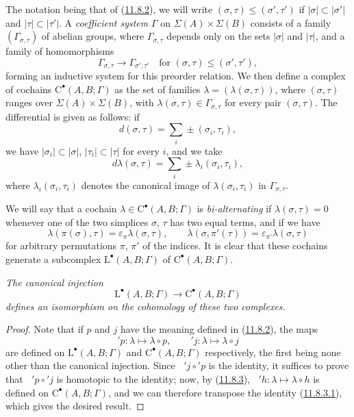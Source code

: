 \begin{env}[11.8.4]
\label{0.11.8.4}
The notation being that of (\hyperref[0.11.8.2]{11.8.2}), we will write
$(\sigma,\tau)\leq(\sigma',\tau')$ if $|\sigma|\subset|\sigma'|$ and
$|\tau|\subset|\tau'|$. A \emph{coefficient system} $\Gamma$ on
$\Sigma(A)\times\Sigma(B)$ consists of a family
$(\Gamma_{\sigma,\tau})$ of abelian groups, where
$\Gamma_{\sigma,\tau}$ depends only on the sets $|\sigma|$ and $|\tau|$,
and a family of homomorphisms
\[
\Gamma_{\sigma,\tau}\longrightarrow\Gamma_{\sigma',\tau'}
\quad\text{for }(\sigma,\tau)\leq(\sigma',\tau'),
\]
forming an inductive system for this preorder relation. We then define
a complex of cochains $\mathrm C^\bullet(A,B;\Gamma)$ as the set
of families $\lambda=(\lambda(\sigma,\tau))$, where $(\sigma,\tau)$ ranges over
$\Sigma(A)\times\Sigma(B)$, with
$\lambda(\sigma,\tau)\in\Gamma_{\sigma,\tau}$ for every pair
$(\sigma,\tau)$. The differential is given as follows: if
\[
d(\sigma,\tau)=\sum_i\pm(\sigma_i,\tau_i),
\]
we have $|\sigma_i|\subset|\sigma|$, $|\tau_i|\subset|\tau|$ for every $i$,
and we take
\[
d\lambda(\sigma,\tau)=\sum_i\pm\lambda_i(\sigma_i,\tau_i),
\]
where $\lambda_i(\sigma_i,\tau_i)$ denotes the canonical image of
$\lambda(\sigma_i,\tau_i)$ in $\Gamma_{\sigma,\tau}$.

We will say that a cochain $\lambda\in\mathrm C^\bullet(A,B;\Gamma)$ is
\emph{bi-alternating} if $\lambda(\sigma,\tau)=0$ whenever one of the two
simplices $\sigma$, $\tau$ has two equal terms, and if we have
\[
\lambda(\pi(\sigma),\tau)=\varepsilon_\pi\lambda(\sigma,\tau),
\qquad
\lambda(\sigma,\pi'(\tau))=\varepsilon_{\pi'}\lambda(\sigma,\tau)
\]
for arbitrary permutations $\pi$, $\pi'$ of the indices. It is clear
that these cochains generate a subcomplex
$\mathrm L^\bullet(A,B;\Gamma)$ of $\mathrm C^\bullet(A,B;\Gamma)$.
\end{env}

\begin{proposition}[11.8.5]
\label{0.11.8.5}
\emph{The canonical injection
\[
\mathrm L^\bullet(A,B;\Gamma)\longrightarrow
\mathrm C^\bullet(A,B;\Gamma)
\]
defines an isomorphism on the cohomology of these two complexes.}
\end{proposition}

\begin{proof}
Note that if $p$ and $j$ have the meaning defined in
(\hyperref[0.11.8.2]{11.8.2}), the maps
\[
{}'p:\lambda\longmapsto\lambda\circ p,\qquad
{}'j:\lambda\longmapsto\lambda\circ j
\]
are defined on $\mathrm L^\bullet(A,B;\Gamma)$ and
$\mathrm C^\bullet(A,B;\Gamma)$ respectively, the first being none other
than the canonical injection. Since $\mathop{}'j\circ{}'p$ is the identity, it
suffices to prove that $\mathop{}'p\circ{}'j$ is homotopic to the identity;
now, by (\hyperref[0.11.8.3]{11.8.3}),
$\mathop{}'h:\lambda\mapsto\lambda\circ h$ is defined on
$\mathrm C^\bullet(A,B;\Gamma)$, and we can therefore transpose the identity
(\hyperref[0.11.8.3.1]{11.8.3.1}), which gives the desired result.
\end{proof}

